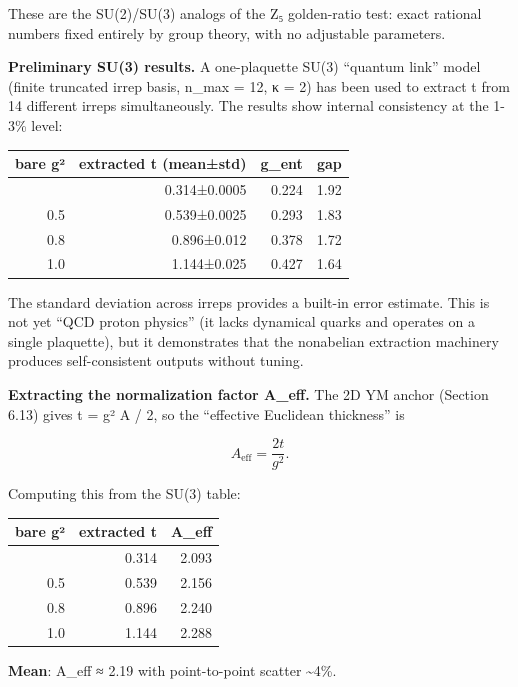 \documentclass[
]{article}
\newcounter{none} %
\begin{document}
These are the SU(2)/SU(3) analogs of the Z₅ golden-ratio test: exact
rational numbers fixed entirely by group theory, with no adjustable
parameters.

\textbf{Preliminary SU(3) results.} A one-plaquette SU(3) ``quantum
link'' model (finite truncated irrep basis, n\_max = 12, κ = 2) has been
used to extract t from 14 different irreps simultaneously. The results
show internal consistency at the 1-3\% level:

{\def\LTcaptype{none} %
\begin{longtable}[]{@{}rrrr@{}}
\toprule\noalign{}
bare g² & extracted t (mean±std) & g\_ent & gap \\
\midrule\noalign{}
\endhead
\bottomrule\noalign{}
\endlastfoot
0.3 & 0.314±0.0005 & 0.224 & 1.92 \\
0.5 & 0.539±0.0025 & 0.293 & 1.83 \\
0.8 & 0.896±0.012 & 0.378 & 1.72 \\
1.0 & 1.144±0.025 & 0.427 & 1.64 \\
\end{longtable}
}

The standard deviation across irreps provides a built-in error estimate.
This is not yet ``QCD proton physics'' (it lacks dynamical quarks and
operates on a single plaquette), but it demonstrates that the nonabelian
extraction machinery produces self-consistent outputs without tuning.

\textbf{Extracting the normalization factor A\_eff.} The 2D YM anchor
(Section 6.13) gives t = g² A / 2, so the ``effective Euclidean
thickness'' is

\[
A_\mathrm{eff} = \frac{2t}{g^2}.
\]

Computing this from the SU(3) table:

{\def\LTcaptype{none} %
\begin{longtable}[]{@{}rrr@{}}
\toprule\noalign{}
bare g² & extracted t & A\_eff \\
\midrule\noalign{}
\endhead
\bottomrule\noalign{}
\endlastfoot
0.3 & 0.314 & 2.093 \\
0.5 & 0.539 & 2.156 \\
0.8 & 0.896 & 2.240 \\
1.0 & 1.144 & 2.288 \\
\end{longtable}
}

\textbf{Mean}: A\_eff ≈ 2.19 with point-to-point scatter
\textasciitilde4\%.
\end{document}
